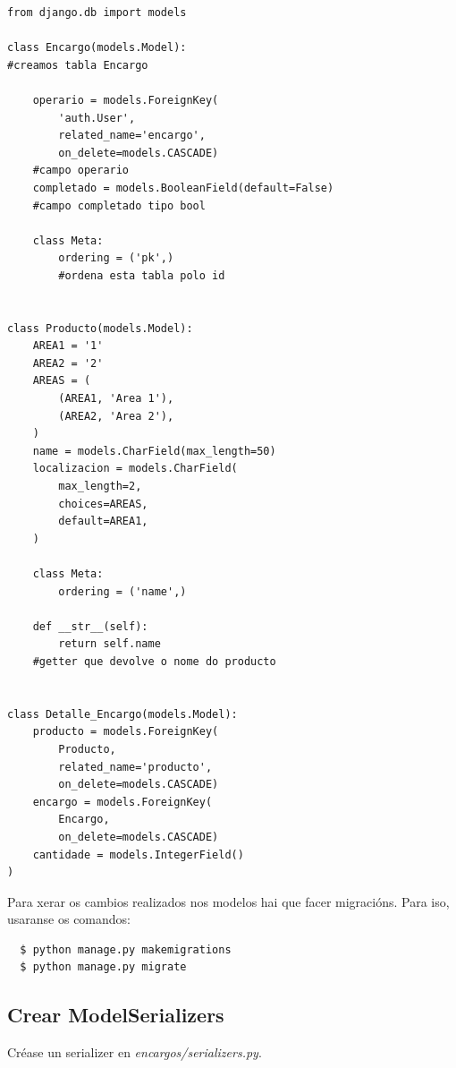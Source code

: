 \documentclass[11pt,twoside]{book}
\begin{document}
\begin{verbatim}
from django.db import models

class Encargo(models.Model):                          
#creamos tabla Encargo                     

    operario = models.ForeignKey(                      
        'auth.User',
        related_name='encargo',
        on_delete=models.CASCADE)
    #campo operario
    completado = models.BooleanField(default=False)  
    #campo completado tipo bool

    class Meta:                                      
        ordering = ('pk',)
        #ordena esta tabla polo id


class Producto(models.Model):
    AREA1 = '1'
    AREA2 = '2'
    AREAS = (
        (AREA1, 'Area 1'),
        (AREA2, 'Area 2'),
    )
    name = models.CharField(max_length=50)
    localizacion = models.CharField(
        max_length=2,
        choices=AREAS,
        default=AREA1, 
    )

    class Meta: 
        ordering = ('name',)

    def __str__(self):
        return self.name                      
    #getter que devolve o nome do producto


class Detalle_Encargo(models.Model):
    producto = models.ForeignKey(
        Producto, 
        related_name='producto', 
        on_delete=models.CASCADE)
    encargo = models.ForeignKey(
        Encargo, 
        on_delete=models.CASCADE)
    cantidade = models.IntegerField()
)
\end{verbatim}

Para xerar os cambios realizados nos modelos hai que facer migracións. Para iso, usaranse os comandos:

\begin{verbatim}
  $ python manage.py makemigrations 
  $ python manage.py migrate
\end{verbatim}

\subsection{Crear ModelSerializers}

Créase un serializer en \textit{encargos/serializers.py}. 
\end{document}
